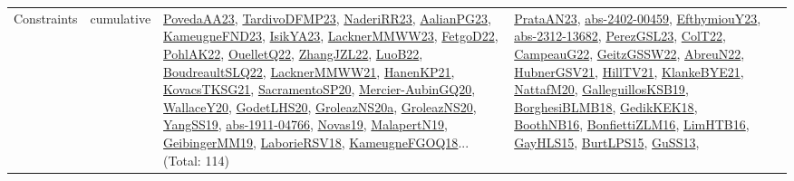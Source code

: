 {\begin{longtable}{lp{3cm}>{\raggedright}p{6cm}>{\raggedright}p{6cm}p{8cm}}
Constraints & cumulative & \href{papers/PovedaAA23.pdf}{PovedaAA23}\cite{PovedaAA23}, \href{papers/TardivoDFMP23.pdf}{TardivoDFMP23}\cite{TardivoDFMP23}, \href{articles/NaderiRR23.pdf}{NaderiRR23}\cite{NaderiRR23}, \href{papers/AalianPG23.pdf}{AalianPG23}\cite{AalianPG23}, \href{papers/KameugneFND23.pdf}{KameugneFND23}\cite{KameugneFND23}, \href{articles/IsikYA23.pdf}{IsikYA23}\cite{IsikYA23}, \href{articles/LacknerMMWW23.pdf}{LacknerMMWW23}\cite{LacknerMMWW23}, \href{articles/FetgoD22.pdf}{FetgoD22}\cite{FetgoD22}, \href{articles/PohlAK22.pdf}{PohlAK22}\cite{PohlAK22}, \href{papers/OuelletQ22.pdf}{OuelletQ22}\cite{OuelletQ22}, \href{papers/ZhangJZL22.pdf}{ZhangJZL22}\cite{ZhangJZL22}, \href{papers/LuoB22.pdf}{LuoB22}\cite{LuoB22}, \href{papers/BoudreaultSLQ22.pdf}{BoudreaultSLQ22}\cite{BoudreaultSLQ22}, \href{papers/LacknerMMWW21.pdf}{LacknerMMWW21}\cite{LacknerMMWW21}, \href{papers/HanenKP21.pdf}{HanenKP21}\cite{HanenKP21}, \href{papers/KovacsTKSG21.pdf}{KovacsTKSG21}\cite{KovacsTKSG21}, \href{articles/SacramentoSP20.pdf}{SacramentoSP20}\cite{SacramentoSP20}, \href{papers/Mercier-AubinGQ20.pdf}{Mercier-AubinGQ20}\cite{Mercier-AubinGQ20}, \href{articles/WallaceY20.pdf}{WallaceY20}\cite{WallaceY20}, \href{papers/GodetLHS20.pdf}{GodetLHS20}\cite{GodetLHS20}, \href{papers/GroleazNS20a.pdf}{GroleazNS20a}\cite{GroleazNS20a}, \href{papers/GroleazNS20.pdf}{GroleazNS20}\cite{GroleazNS20}, \href{papers/YangSS19.pdf}{YangSS19}\cite{YangSS19}, \href{articles/abs-1911-04766.pdf}{abs-1911-04766}\cite{abs-1911-04766}, \href{articles/Novas19.pdf}{Novas19}\cite{Novas19}, \href{papers/MalapertN19.pdf}{MalapertN19}\cite{MalapertN19}, \href{papers/GeibingerMM19.pdf}{GeibingerMM19}\cite{GeibingerMM19}, \href{articles/LaborieRSV18.pdf}{LaborieRSV18}\cite{LaborieRSV18}, \href{papers/KameugneFGOQ18.pdf}{KameugneFGOQ18}\cite{KameugneFGOQ18}... (Total: 114) & \href{articles/PrataAN23.pdf}{PrataAN23}\cite{PrataAN23}, \href{articles/abs-2402-00459.pdf}{abs-2402-00459}\cite{abs-2402-00459}, \href{papers/EfthymiouY23.pdf}{EfthymiouY23}\cite{EfthymiouY23}, \href{articles/abs-2312-13682.pdf}{abs-2312-13682}\cite{abs-2312-13682}, \href{papers/PerezGSL23.pdf}{PerezGSL23}\cite{PerezGSL23}, \href{articles/ColT22.pdf}{ColT22}\cite{ColT22}, \href{articles/CampeauG22.pdf}{CampeauG22}\cite{CampeauG22}, \href{papers/GeitzGSSW22.pdf}{GeitzGSSW22}\cite{GeitzGSSW22}, \href{articles/AbreuN22.pdf}{AbreuN22}\cite{AbreuN22}, \href{articles/HubnerGSV21.pdf}{HubnerGSV21}\cite{HubnerGSV21}, \href{papers/HillTV21.pdf}{HillTV21}\cite{HillTV21}, \href{papers/KlankeBYE21.pdf}{KlankeBYE21}\cite{KlankeBYE21}, \href{papers/NattafM20.pdf}{NattafM20}\cite{NattafM20}, \href{papers/GalleguillosKSB19.pdf}{GalleguillosKSB19}\cite{GalleguillosKSB19}, \href{articles/BorghesiBLMB18.pdf}{BorghesiBLMB18}\cite{BorghesiBLMB18}, \href{articles/GedikKEK18.pdf}{GedikKEK18}\cite{GedikKEK18}, \href{papers/BoothNB16.pdf}{BoothNB16}\cite{BoothNB16}, \href{papers/BonfiettiZLM16.pdf}{BonfiettiZLM16}\cite{BonfiettiZLM16}, \href{papers/LimHTB16.pdf}{LimHTB16}\cite{LimHTB16}, \href{papers/GayHLS15.pdf}{GayHLS15}\cite{GayHLS15}, \href{papers/BurtLPS15.pdf}{BurtLPS15}\cite{BurtLPS15}, \href{papers/GuSS13.pdf}{GuSS13}\cite{GuSS13}, 
\end{longtable}}
